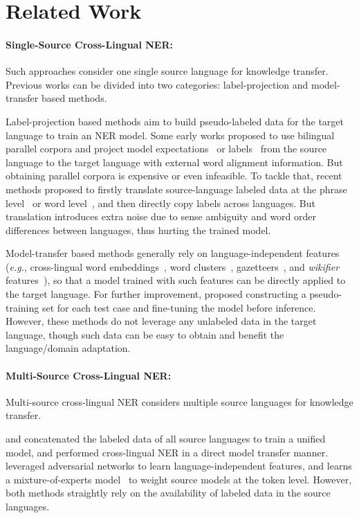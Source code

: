 \documentclass[11pt,a4paper]{article}
\newcommand\eg{\textit{e.g.}}
\begin{document}
	\section{Related Work}
	\paragraph{Single-Source Cross-Lingual NER: }
	Such approaches consider one single source language for knowledge transfer. Previous works can be divided into two categories: label-projection and model-transfer based methods.
	
	Label-projection based methods aim to build pseudo-labeled data for the target language to train an NER model. 
	Some early works proposed to use bilingual parallel corpora and project model expectations~\cite{wang2014cross} or labels~\cite{ni2017weakly} from the source language to the target language with external word alignment information. 
	But obtaining parallel corpora is expensive or even infeasible.
To tackle that, recent methods proposed to firstly translate source-language labeled data at the phrase level~\cite{mayhew2017cheap} or word level~\cite{xie2018neural}, and then directly copy labels across languages. But translation introduces extra noise due to sense ambiguity and word order differences between languages, thus hurting the trained model.
	
	Model-transfer based methods generally rely on language-independent features (\eg, cross-lingual word embeddings~\cite{ni2017weakly,huang2019cross,wu2019beto,moon2019lingua}, word clusters~\cite{tackstrom2012cross}, gazetteers~\cite{zirikly2015cross}, and \emph{wikifier} features~\cite{tsai2016cross}), so that a model trained with such features can be directly applied to the target language. 
	For further improvement, \citet{wu2020enhanced} proposed constructing a pseudo-training set for each test case and fine-tuning the model before inference. However, these methods do not leverage any unlabeled data in the target language, though such data can be easy to obtain and benefit the language/domain adaptation. 
	
	\paragraph{Multi-Source Cross-Lingual NER: }
	Multi-source cross-lingual NER considers multiple source languages for knowledge transfer.

	\citet{tackstrom2012nudging} and \citet{moon2019lingua} concatenated the labeled data of all source languages to train a unified model, and performed cross-lingual NER in a direct model transfer manner. \citet{chen2019multi} leveraged adversarial networks to learn language-independent features, and learns a mixture-of-experts model~\cite{shazeer2017outrageously} to weight source models at the token level. However, both methods straightly rely on the availability of labeled data in the source languages.
	
\end{document}

